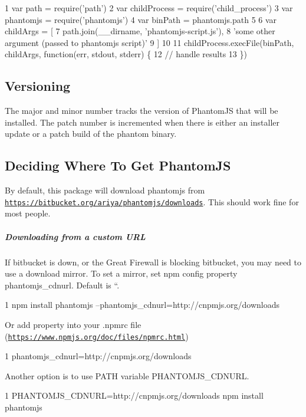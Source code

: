 \begin{DoxyCode}
1 var path = require('path')
2 var childProcess = require('child\_process')
3 var phantomjs = require('phantomjs')
4 var binPath = phantomjs.path
5 
6 var childArgs = [
7   path.join(\_\_dirname, 'phantomjs-script.js'),
8   'some other argument (passed to phantomjs script)'
9 ]
10 
11 childProcess.execFile(binPath, childArgs, function(err, stdout, stderr) \{
12   // handle results
13 \})
\end{DoxyCode}


\subsection*{Versioning }

The major and minor number tracks the version of Phantom\+J\+S that will be installed. The patch number is incremented when there is either an installer update or a patch build of the phantom binary.

\subsection*{Deciding Where To Get Phantom\+J\+S }

By default, this package will download phantomjs from {\ttfamily \href{https://bitbucket.org/ariya/phantomjs/downloads}{\tt https\+://bitbucket.\+org/ariya/phantomjs/downloads}}. This should work fine for most people.

\subparagraph*{Downloading from a custom U\+R\+L}

If bitbucket is down, or the Great Firewall is blocking bitbucket, you may need to use a download mirror. To set a mirror, set npm config property {\ttfamily phantomjs\+\_\+cdnurl}. Default is ``.


\begin{DoxyCode}
1 npm install phantomjs --phantomjs\_cdnurl=http://cnpmjs.org/downloads
\end{DoxyCode}


Or add property into your {\ttfamily .npmrc} file (\href{https://www.npmjs.org/doc/files/npmrc.html}{\tt https\+://www.\+npmjs.\+org/doc/files/npmrc.\+html})


\begin{DoxyCode}
1 phantomjs\_cdnurl=http://cnpmjs.org/downloads
\end{DoxyCode}


Another option is to use P\+A\+T\+H variable {\ttfamily P\+H\+A\+N\+T\+O\+M\+J\+S\+\_\+\+C\+D\+N\+U\+R\+L}. 
\begin{DoxyCode}
1 PHANTOMJS\_CDNURL=http://cnpmjs.org/downloads npm install phantomjs
\end{DoxyCode}


